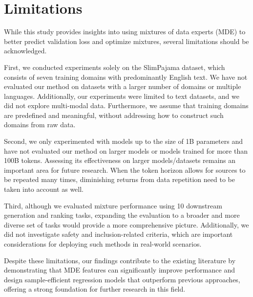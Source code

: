 \section{Limitations}

While this study provides insights into using mixtures of data experts (MDE) to better predict validation loss and optimize mixtures, several limitations should be acknowledged.

First, we conducted experiments solely on the SlimPajama dataset, which consists of seven training domains with predominantly English text. We have not evaluated our method on datasets with a larger number of domains or multiple languages. Additionally, our experiments were limited to text datasets, and we did not explore multi-modal data. Furthermore, we assume that training domains are predefined and meaningful, without addressing how to construct such domains from raw data.

Second, we only experimented with models up to the size of 1B parameters and have not evaluated our method on larger models or models trained for more than 100B tokens. Assessing its effectiveness on larger models/datasets remains an important area for future research. When the token horizon allows for sources to be repeated many times, diminishing returns from data repetition need to be taken into account as well.

Third, although we evaluated mixture performance using 10 downstream generation and ranking tasks, expanding the evaluation to a broader and more diverse set of tasks would provide a more comprehensive picture. Additionally, we did not investigate safety and inclusion-related criteria, which are important considerations for deploying such methods in real-world scenarios.

Despite these limitations, our findings contribute to the existing literature by demonstrating that MDE features can significantly improve performance and design sample-efficient regression models that outperform previous approaches, offering a strong foundation for further research in this field.


